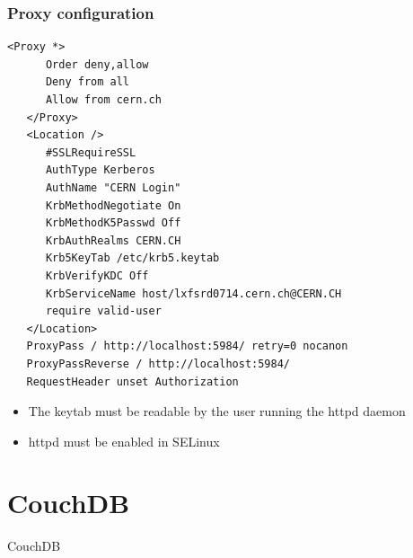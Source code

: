 \documentclass{beamer}
\begin{document}
\begin{frame}[t, fragile]
\frametitle{Proxy configuration}
{ \tiny
\begin{center}
\begin{minipage}{.6\textwidth}
\begin{lstlisting}[basicstyle=\tiny,numberstyle=\tiny,backgroundcolor=\color{black!20}]
   <Proxy *>
      Order deny,allow
      Deny from all
      Allow from cern.ch
   </Proxy>
   <Location />
      #SSLRequireSSL
      AuthType Kerberos
      AuthName "CERN Login"
      KrbMethodNegotiate On
      KrbMethodK5Passwd Off
      KrbAuthRealms CERN.CH
      Krb5KeyTab /etc/krb5.keytab
      KrbVerifyKDC Off
      KrbServiceName host/lxfsrd0714.cern.ch@CERN.CH
      require valid-user
   </Location>
   ProxyPass / http://localhost:5984/ retry=0 nocanon
   ProxyPassReverse / http://localhost:5984/
   RequestHeader unset Authorization
\end{lstlisting}
\end{minipage}
\end{center}
}
\begin{itemize}
\item The keytab must be readable by the user running the httpd daemon
\item httpd must be enabled in SELinux
\end{itemize}
\end{frame}

\section{CouchDB}
\begin{frame}[c]
\begin{center}
\Huge \textcolor{BrickRed}{CouchDB}
\end{center}
\end{frame}
\end{document}
